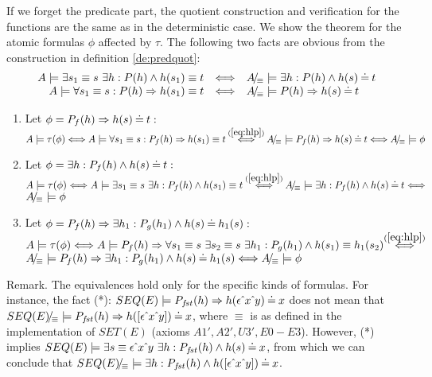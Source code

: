 \begin{PROOF}
If we forget the predicate part, the quotient construction and verification for the functions are the same as in the deterministic case. We show the theorem for the atomic formulas $\phi$ affected by $\tau$. The following two facts are obvious from the construction in definition \ref{de:predquot}:
\begin{equation}\label{eq:hlp}
\begin{array}{rcl}
A\models \exists s_1\equiv s\ \exists h:P(h)\land h(s_1)\equiv t & \mathrel{\Longleftrightarrow} & A\!{\textstyle /}\!_\equiv\models\exists h:P(h)\land h(s)\mathbin{\doteq} t \\ A\models \forall s_1\equiv s:P(h)\mathrel\Rightarrow h(s_1)\equiv t & \mathrel{\Longleftrightarrow} & A\!{\textstyle /}\!_\equiv\models P(h)\mathrel\Rightarrow h(s)\mathbin{\doteq} t \end{array}
\end{equation}
\begin{enumerate}\MyLPar
\item Let $\phi = P_{f}(h)\mathrel\Rightarrow h(s)\mathbin{\doteq} t:$ \\[-1ex] $A\models \tau(\phi) \ifff
A\models \forall s_1\equiv s: \Pre Pf(h)\impl h(s_1)\equiv t \ToT{\re{eq:hlp}}
\quot A\equiv\models \Pre Pf(h)\impl h(s)\Eq t \ifff \quot A\equiv\models \phi$

\item Let $\phi = \exists h: P_{f}(h)\land h(s)\mathbin{\doteq} t :$\\[-1ex] $A\models \tau(\phi) \ifff
A\models \exists s_1\equiv s\ \exists h: \Pre Pf(h)\land h(s_1)\equiv t 
\ToT{\re{eq:hlp}}
\quot A\equiv\models \exists h: \Pre Pf(h)\land h(s)\Eq t \ifff $\\ $A\!{\textstyle /}\!_\equiv \models \phi $

\item Let $\phi =P_{f}(h)\mathrel\Rightarrow\exists h_1 :P_{g}(h_1)\land h(s)\mathbin{\doteq} h_1(s):$
\\[-1ex]
$A\models \tau(\phi)\ifff A\models
\Pre Pf(h)\impl \forall s_1\equiv s\ \exists s_2\equiv s\ \exists h_1 : \Pre Pg(h_1)\land h(s_1)\equiv h_1(s_2) \ToT{\re{eq:hlp}} $\\ $ A\!{\textstyle /}\!_\equiv\models
P_{f}(h)\mathrel\Rightarrow \exists h_1 :P_{g}(h_1)\land h(s)\mathbin{\doteq} h_1(s)\mathrel{\Longleftrightarrow} A\!{\textstyle /}\!_\equiv \models \phi $
\nopagebreak \end{enumerate}\nopagebreak \end{PROOF}
\begin{SREMARK}{Remark.}
The equivalences  hold only for the specific kinds of formulas. For instance, the fact (*): $SEQ(E)\models P_{f\!st}(h)\mathrel\Rightarrow h(\epsilon\hat{\ } x\hat{\ } y)\mathbin{\doteq} x$ does not mean that $SEQ(E)\!{\textstyle /}\!_\equiv \models P_{f\!st}(h)\mathrel\Rightarrow h([\epsilon\hat{\ } x\hat{\ } y])\mathbin{\doteq} x$, where $\equiv$ is as defined
in the implementation of $SET(E)$ (axioms $A1',A2',U3',E0-E3$). However, (*) implies
$SEQ(E)\models \exists s\equiv \epsilon\hat{\ } x\hat{\ } y\ \exists h:P_{f\!st}(h)
\land h(s)\mathbin{\doteq} x$, from which we can conclude that $SEQ(E)\!{\textstyle /}\!_\equiv \models \exists h:P_{f\!st}(h)\land h([\epsilon\hat{\ } x\hat{\ } y])\mathbin{\doteq} x$. \end{SREMARK}
